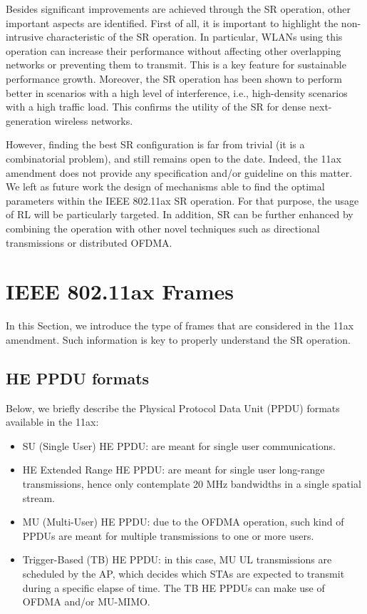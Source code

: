 \documentclass[comsoc]{IEEEtran}
\begin{document}
	Besides significant improvements are achieved through the SR operation, other important aspects are identified. First of all, it is important to highlight the non-intrusive characteristic of the SR operation. In particular, WLANs using this operation can increase their performance without affecting other overlapping networks or preventing them to transmit. This is a key feature for sustainable performance growth. Moreover, the SR operation has been shown to perform better in scenarios with a high level of interference, i.e., high-density scenarios with a high traffic load. This confirms the utility of the SR for dense next-generation wireless networks. 
	
	However, finding the best SR configuration is far from trivial (it is a combinatorial problem), and still remains open to the date. Indeed, the 11ax amendment does not provide any specification and/or guideline on this matter. We left as future work the design of mechanisms able to find the optimal parameters within the IEEE 802.11ax SR operation. For that purpose, the usage of RL will be particularly targeted. In addition, SR can be further enhanced by combining the operation with other novel techniques such as directional transmissions or distributed OFDMA.

	\appendices
	\section{IEEE 802.11ax Frames}
	\label{section:frames}
	In this Section, we introduce the type of frames that are considered in the 11ax amendment. Such information is key to properly understand the SR operation.
	
	\subsection{HE PPDU formats}
	Below, we briefly describe the Physical Protocol Data Unit (PPDU) formats available in the 11ax:
	\begin{itemize}
		\item SU (Single User) HE PPDU: are meant for single user communications.
		\item  HE Extended Range HE PPDU: are meant for single user long-range transmissions, hence only contemplate 20 MHz bandwidths in a single spatial stream.
		\item  MU (Multi-User) HE PPDU: due to the OFDMA operation, such kind of PPDUs are meant for multiple transmissions to one or more users.
		\item Trigger-Based (TB) HE PPDU: in this case, MU UL transmissions are scheduled by the AP, which decides which STAs are expected to transmit during a specific elapse of time. The TB HE PPDUs can make use of OFDMA and/or MU-MIMO.
	\end{itemize}
	
\end{document}

